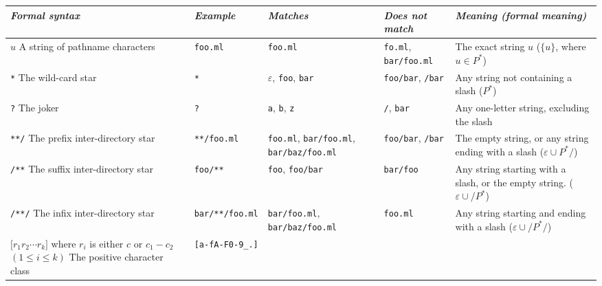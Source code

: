 \documentclass[9pt]{article}
\begin{document}
\begin{table}[h]
  \begin{center}
    \small
    \begin{tabular}{|p{3cm}|l|p{3cm}|p{3cm}|p{5cm}|}
    \hline
    {\em Formal syntax} &
    {\em Example} & {\em Matches} & {\em Does not match} &
    {\em Meaning (formal meaning)} \\
    \hline
    \hline
    {$u$ \vspace*{0.5em} A string of pathname characters} &
    \texttt{foo.ml} &
    \texttt{foo.ml} &
    \texttt{fo.ml}, \texttt{bar/foo.ml} &
    The exact string $u$
    ($\{ u \}$, where $u \in P^*$) \\
    \hline
    {\texttt{*} \vspace*{0.5em} The wild-card star}&
    \texttt{*}&
    $\varepsilon$, \texttt{foo}, \texttt{bar} &
    \texttt{foo/bar}, \texttt{/bar} &
    Any string not containing a slash
    ($P^*$) \\
    \hline
    {\texttt{?} \vspace*{0.5em} The joker}&
    \texttt{?}&
    \texttt{a}, \texttt{b}, \texttt{z} &
    \texttt{/}, \texttt{bar} &
    Any one-letter string, excluding the slash \\
    \hline
    {\texttt{**/} \vspace*{0.5em} The prefix inter-directory star}&
    \texttt{**/foo.ml}&
    \texttt{foo.ml}, \texttt{bar/foo.ml}, \texttt{bar/baz/foo.ml} &
    \texttt{foo/bar}, \texttt{/bar} &
    The empty string, or any string ending with a slash
    ($\varepsilon \cup P^*\mathtt{/}$) \\
    \hline
    {\texttt{/**} \vspace*{0.5em} The suffix inter-directory star}&
    \texttt{foo/**}&
    \texttt{foo}, \texttt{foo/bar} &
    \texttt{bar/foo} &
    Any string starting with a slash, or the empty string.
    ($\varepsilon \cup \mathtt{/}P^*$) \\
    \hline
    {\texttt{/**/} \vspace*{0.5em} The infix inter-directory star}&
    \texttt{bar/**/foo.ml}&
    \texttt{bar/foo.ml}, \texttt{bar/baz/foo.ml} &
    \texttt{foo.ml} &
    Any string starting and ending with a slash
    ($\varepsilon \cup \mathtt{/}P^*\mathtt{/}$) \\
    \hline
    {$\mathtt{[} r_1 r_2 \cdots r_k \mathtt{]}$
    where $r_i$ is either $c$ or $c_1-c_2$ $(1 \leq i \leq k)$
    \vspace*{0.5em} The positive character class}&
    \texttt{[a-fA-F0-9\_.]}&

\end{tabular}
\end{center}
\end{table}
\end{document}
